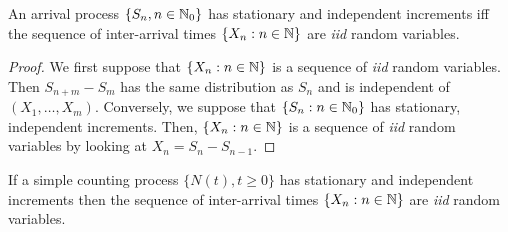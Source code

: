 \documentclass[a4paper,10pt,english]{article}
\begin{document}
\begin{lem} 
An arrival process $\{S_n, n \in \mathbb{N}_0\}$ has stationary and independent increments iff 
the sequence of inter-arrival times $\{X_n: n \in \mathbb{N}\}$ are \emph{iid} random variables.
\end{lem}
\begin{proof} 
We first suppose that $\{X_n: n \in \mathbb{N}\}$ is a sequence of \emph{iid} random variables. 
Then $S_{n+m} - S_m$ has the same distribution as $S_n$ and is independent of $(X_1, \ldots, X_m)$. 
Conversely, we suppose that $\{S_n: n \in \mathbb{N}_0\}$ has stationary, independent increments. 
Then, $\{X_n: n \in \mathbb{N}\}$ is a sequence of \emph{iid} random variables by looking at $X_n = S_n - S_{n-1}$.   
\end{proof}

\begin{lem} If a simple counting process $\{N(t), t \geqslant 0\}$ has stationary and independent increments then 
the sequence of inter-arrival times $\{X_n: n \in \mathbb{N}\}$ are \emph{iid} random variables.
\end{lem}
\end{document}
